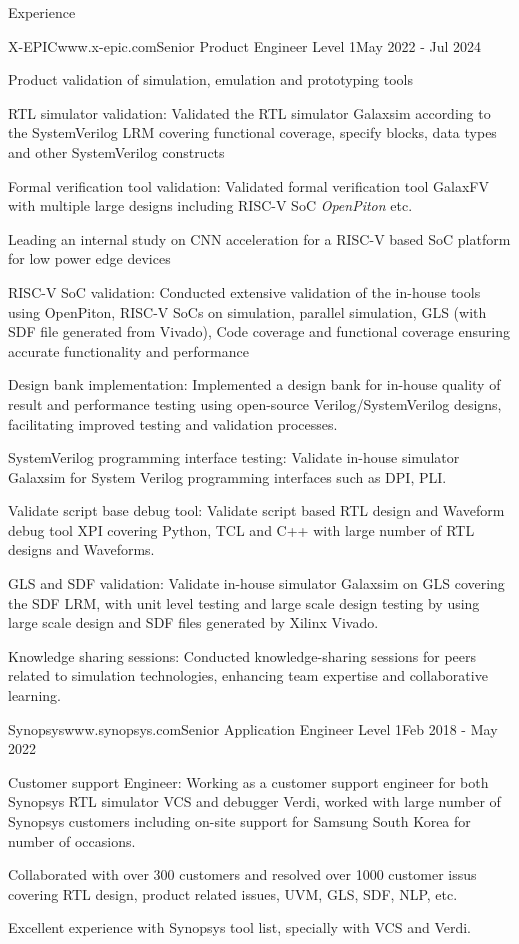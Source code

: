 \documentclass[
11pt, %
]{./assets/resume} %
\begin{document}
\begin{rSection}{Experience}
	\begin{rSubsectionX}{X-EPIC}{www.x-epic.com}{Senior Product Engineer Level 1}{May 2022 - Jul 2024}
		\item Product validation of simulation, emulation and prototyping tools
		\item RTL simulator validation: Validated the RTL simulator Galaxsim according to the SystemVerilog LRM covering functional coverage, specify blocks, data types and other SystemVerilog constructs
		\item Formal verification tool validation: Validated formal verification tool GalaxFV with multiple large designs including RISC-V SoC \textit{OpenPiton} etc.
		\item Leading an internal study on CNN acceleration for a RISC-V based SoC platform for low power edge devices
		\item RISC-V SoC validation: Conducted extensive validation of the in-house tools using OpenPiton, RISC-V SoCs on simulation, parallel simulation, GLS (with SDF file generated from Vivado), Code coverage and functional coverage ensuring accurate functionality and performance
		\item Design bank implementation: Implemented a design bank for in-house quality of result and performance testing using open-source Verilog/SystemVerilog designs, facilitating improved testing and validation processes.
		\item SystemVerilog programming interface testing: Validate in-house simulator Galaxsim for System Verilog programming interfaces such as DPI, PLI.
		\item Validate script base debug tool: Validate script based RTL design and Waveform debug tool XPI covering Python, TCL and C++ with large number of RTL designs and Waveforms.
		\item GLS and SDF validation: Validate in-house simulator Galaxsim on GLS covering the SDF LRM, with unit level testing and large scale design testing by using large scale design and SDF files generated by Xilinx Vivado.
		\item Knowledge sharing sessions: Conducted knowledge-sharing sessions for peers related to simulation technologies, enhancing team expertise and collaborative learning.
	\end{rSubsectionX}
	\begin{rSubsectionX}{Synopsys}{www.synopsys.com}{Senior Application Engineer Level 1}{Feb 2018 - May 2022}
		\item Customer support Engineer: Working as a customer support engineer for both Synopsys RTL simulator VCS and debugger Verdi, worked with large number of Synopsys customers including on-site support for Samsung South Korea for number of occasions.
		\item Collaborated with over 300 customers and resolved over 1000 customer issus covering RTL design, product related issues, UVM, GLS, SDF, NLP, etc.
		\item Excellent experience with Synopsys tool list, specially with VCS and Verdi.
	\end{rSubsectionX}
	

\end{rSection}
\end{document}
